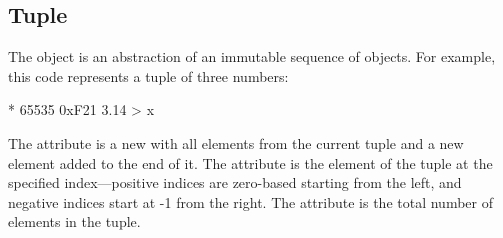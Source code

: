 
\subsection{Tuple}\label{sec:tuple}

The  object is an abstraction of an immutable sequence of objects.
For example, this code represents a tuple  of three numbers:

\begin{ffcode}
* 65535 0xF21 3.14 > x
\end{ffcode}

The  attribute is a new  with all elements
  from the current tuple and a new element added to the end of it.
%
The  attribute is the element of the tuple at the specified
  index---positive indices are zero-based starting from the left,
  and negative indices start at -1 from the right.
%
The  attribute is the total number of elements in the tuple.
